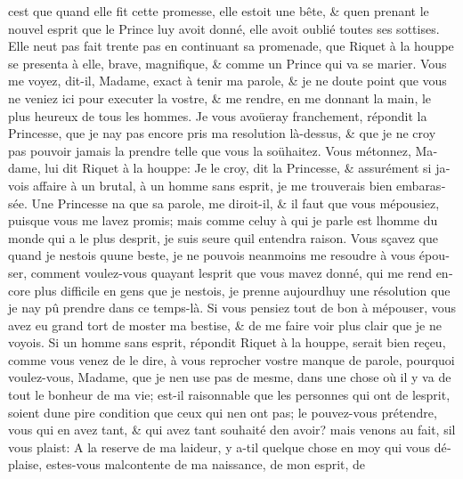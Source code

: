 \documentclass[14pt,a4paper]{memoir}
\begin{document}
\begin{otherlanguage}{french}
c\textquotesingle est que quand elle fit cette promesse, elle estoit une
bête, \& qu\textquotesingle en prenant le nouvel esprit que le Prince
luy avoit donné, elle avoit oublié toutes ses sottises. Elle
n\textquotesingle eut pas fait trente pas en continuant sa promenade,
que Riquet à la houppe se presenta à elle, brave, magnifique, \& comme
un Prince qui va se marier. Vous me voyez, dit-il, Madame, exact à tenir
ma parole, \& je ne doute point que vous ne veniez ici pour executer la
vostre, \& me rendre, en me donnant la main, le plus heureux de tous les
hommes. Je vous avoüeray franchement, répondit la Princesse, que je
n\textquotesingle ay pas encore pris ma resolution là-dessus, \& que je
ne croy pas pouvoir jamais la prendre telle que vous la soühaitez. Vous
m\textquotesingle étonnez, Madame, lui dit Riquet à la houppe: Je le
croy, dit la Princesse, \& assurément si j\textquotesingle avois affaire
à un brutal, à un homme sans esprit, je me trouverais bien embarassée.
Une Princesse n\textquotesingle a que sa parole, me diroit-il, \& il
faut que vous m\textquotesingle épousiez, puisque vous me
l\textquotesingle avez promis; mais comme celuy à qui je parle est
l\textquotesingle homme du monde qui a le plus d\textquotesingle esprit,
je suis seure qu\textquotesingle il entendra raison. Vous sçavez que
quand je n\textquotesingle estois qu\textquotesingle une beste, je ne
pouvois neanmoins me resoudre à vous épouser, comment voulez-vous
qu\textquotesingle ayant l\textquotesingle esprit que vous
m\textquotesingle avez donné, qui me rend encore plus difficile en gens
que je n\textquotesingle estois, je prenne aujourd\textquotesingle huy
une résolution que je n\textquotesingle ay pû prendre dans ce temps-là.
Si vous pensiez tout de bon à m\textquotesingle épouser, vous avez eu
grand tort de m\textquotesingle oster ma bestise, \& de me faire voir
plus clair que je ne voyois. Si un homme sans esprit, répondit Riquet à
la houppe, serait bien reçeu, comme vous venez de le dire, à vous
reprocher vostre manque de parole, pourquoi voulez-vous, Madame, que je
n\textquotesingle en use pas de mesme, dans une chose où il y va de tout
le bonheur de ma vie; est-il raisonnable que les personnes qui ont de
l\textquotesingle esprit, soient d\textquotesingle une pire condition
que ceux qui n\textquotesingle en ont pas; le pouvez-vous prétendre,
vous qui en avez tant, \& qui avez tant souhaité d\textquotesingle en
avoir? mais venons au fait, s\textquotesingle il vous plaist: A la
reserve de ma laideur, y a-t\textquotesingle il quelque chose en moy qui
vous déplaise, estes-vous malcontente de ma naissance, de mon esprit, de

\end{otherlanguage}
\end{document}
